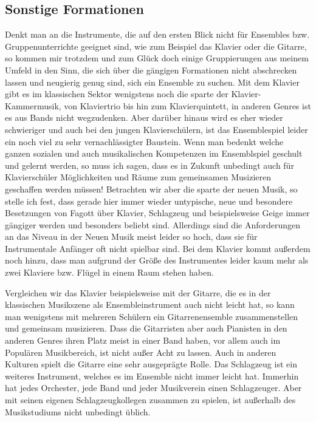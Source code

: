 \subsection{Sonstige Formationen}
Denkt man an die Instrumente, die auf den ersten Blick nicht für
Ensembles bzw. Gruppenunterrichte geeignet sind, wie zum Beispiel das Klavier
oder die Gitarre, so kommen mir trotzdem und zum Glück doch einige Gruppierungen
aus meinem Umfeld in den Sinn, die sich über die gängigen Formationen nicht
abschrecken lassen und neugierig genug sind, sich ein Ensemble zu suchen. Mit
dem Klavier gibt es im klassischen Sektor wenigstens noch die sparte der Klavier-Kammermusik, von
Klaviertrio bis hin zum Klavierquintett, in anderen Genres ist es aus Bands
nicht wegzudenken. Aber darüber hinaus wird es eher wieder
schwieriger und auch bei den jungen Klavierschülern, ist das Ensemblespiel
leider ein noch viel zu sehr vernachlässigter Baustein. Wenn man bedenkt welche
ganzen sozialen und auch musikalischen Kompetenzen im Ensemblspiel geschult und
gelernt werden, so muss ich sagen, dass es in Zukunft unbedingt auch für
Klavierschüler Möglichkeiten und Räume zum gemeinsamen Musizieren geschaffen
werden müssen! Betrachten wir aber die sparte der neuen Musik, so stelle ich
fest, dass gerade hier immer wieder untypische, neue und besondere Besetzungen
von Fagott über Klavier, Schlagzeug und beispielsweise Geige immer gängiger
werden und besonders beliebt sind. Allerdings sind die Anforderungen an das
Niveau in der Neuen Musik meist leider so hoch, dass sie für Instrumentale
Anfänger oft nicht spielbar sind. Bei dem Klavier kommt außerdem noch hinzu, dass
man aufgrund der Größe des Instrumentes leider kaum mehr als zwei Klaviere bzw.
Flügel in einem Raum stehen haben. 

Vergleichen wir das Klavier beispielsweise mit der Gitarre, die es in der
klassischen Musikszene als Ensembleinstrument auch nicht leicht hat, so kann man
wenigstens mit mehreren Schülern ein Gitarrenensemble zusammenstellen und
gemeinsam musizieren. Dass die Gitarristen aber auch Pianisten in den anderen
Genres ihren Platz meist in einer Band haben, vor allem auch im Populären
Musikbereich, ist nicht außer Acht zu lassen. Auch in anderen Kulturen spielt
die Gitarre eine sehr ausgeprägte Rolle.
Das Schlagzeug ist ein weiteres Instrument, welches es im Ensemble nicht immer
leicht hat. Immerhin hat jedes Orchester, jede Band und jeder Musikverein einen
Schlagzeuger. Aber mit seinen eigenen Schlagzeugkollegen zusammen zu spielen,
ist außerhalb des Musikstudiums nicht unbedingt üblich. 





